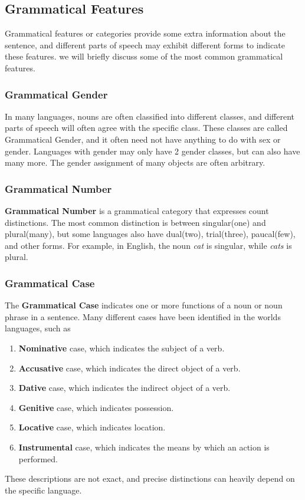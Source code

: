 \subsection{Grammatical Features}
Grammatical features or categories provide some extra information about the sentence, and different parts of speech may exhibit different forms
to indicate these features. we will briefly discuss some of the most common grammatical features.

\subsubsection{Grammatical Gender}
In many languages, nouns are often classified into different classes, and different parts of speech will often agree with the specific class. These classes
are called Grammatical Gender, and it often need not have anything to do with sex or gender. Languages with gender may only have 2 gender classes, but can also
have many more. The gender assignment of many objects are often arbitrary. 

\subsubsection{Grammatical Number}
\textbf{Grammatical Number} is a grammatical category that expresses count distinctions. The most common distinction is between singular(one) and plural(many), but
some languages also have dual(two), trial(three), paucal(few), and other forms. For example, in English, the noun \textit{cat} is singular, while \textit{cats} is plural.

\subsubsection{Grammatical Case}
The \textbf{Grammatical Case} indicates one or more functions of a noun or noun phrase in a sentence. Many different cases have been identified in the worlds languages, such as

\begin{enumerate}
    \item \textbf{Nominative} case, which indicates the subject of a verb.
    \item \textbf{Accusative} case, which indicates the direct object of a verb.
    \item \textbf{Dative} case, which indicates the indirect object of a verb.
    \item \textbf{Genitive} case, which indicates possession.
    \item \textbf{Locative} case, which indicates location.
    \item \textbf{Instrumental} case, which indicates the means by which an action is performed.
\end{enumerate}
These descriptions are not exact, and precise distinctions can heavily depend on the specific language.

